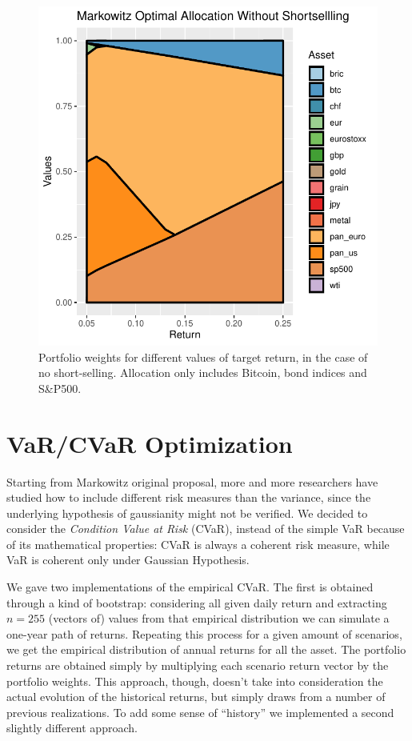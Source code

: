\documentclass[12pt]{elsarticle}
\begin{document}
\begin{figure}[h!]
\includegraphics[width=\textwidth]{allocation_markowitz_btc.pdf}
\caption{Portfolio weights for different values of target return, in the case of no short-selling. Allocation only includes Bitcoin, bond indices and S\&P500.}
\end{figure}





\section{VaR/CVaR Optimization}
Starting from Markowitz original proposal, more and more researchers have studied how to include different risk measures than the variance, since the underlying hypothesis of gaussianity might not be verified.
We decided to consider the \textit{Condition Value at Risk} (CVaR), instead of the simple VaR because of its mathematical properties: CVaR is always a coherent risk measure, while VaR is coherent only under Gaussian Hypothesis.

We gave two implementations of the empirical CVaR. The first is obtained through a kind of bootstrap: considering all given daily return and extracting $n=255$ (vectors of) values from that empirical distribution we can simulate a one-year path of returns. Repeating this process for a given amount of scenarios, we get the empirical distribution of annual returns for all the asset. The portfolio returns are obtained simply by multiplying each scenario return vector by the portfolio weights. 
This approach, though, doesn't take into consideration the actual evolution of the historical returns, but simply draws from a number of previous realizations.
To add some sense of ``history'' we implemented a second slightly different approach.
\end{document}
